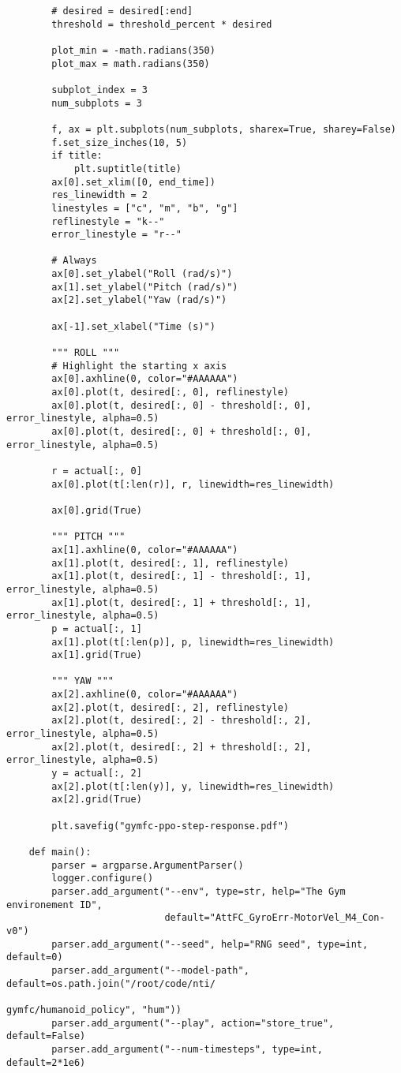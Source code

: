 \begin{verbatim}
        # desired = desired[:end]
        threshold = threshold_percent * desired

        plot_min = -math.radians(350)
        plot_max = math.radians(350)

        subplot_index = 3
        num_subplots = 3

        f, ax = plt.subplots(num_subplots, sharex=True, sharey=False)
        f.set_size_inches(10, 5)
        if title:
            plt.suptitle(title)
        ax[0].set_xlim([0, end_time])
        res_linewidth = 2
        linestyles = ["c", "m", "b", "g"]
        reflinestyle = "k--"
        error_linestyle = "r--"

        # Always
        ax[0].set_ylabel("Roll (rad/s)")
        ax[1].set_ylabel("Pitch (rad/s)")
        ax[2].set_ylabel("Yaw (rad/s)")

        ax[-1].set_xlabel("Time (s)")

        """ ROLL """
        # Highlight the starting x axis
        ax[0].axhline(0, color="#AAAAAA")
        ax[0].plot(t, desired[:, 0], reflinestyle)
        ax[0].plot(t, desired[:, 0] - threshold[:, 0], error_linestyle, alpha=0.5)
        ax[0].plot(t, desired[:, 0] + threshold[:, 0], error_linestyle, alpha=0.5)

        r = actual[:, 0]
        ax[0].plot(t[:len(r)], r, linewidth=res_linewidth)

        ax[0].grid(True)

        """ PITCH """
        ax[1].axhline(0, color="#AAAAAA")
        ax[1].plot(t, desired[:, 1], reflinestyle)
        ax[1].plot(t, desired[:, 1] - threshold[:, 1], error_linestyle, alpha=0.5)
        ax[1].plot(t, desired[:, 1] + threshold[:, 1], error_linestyle, alpha=0.5)
        p = actual[:, 1]
        ax[1].plot(t[:len(p)], p, linewidth=res_linewidth)
        ax[1].grid(True)

        """ YAW """
        ax[2].axhline(0, color="#AAAAAA")
        ax[2].plot(t, desired[:, 2], reflinestyle)
        ax[2].plot(t, desired[:, 2] - threshold[:, 2], error_linestyle, alpha=0.5)
        ax[2].plot(t, desired[:, 2] + threshold[:, 2], error_linestyle, alpha=0.5)
        y = actual[:, 2]
        ax[2].plot(t[:len(y)], y, linewidth=res_linewidth)
        ax[2].grid(True)

        plt.savefig("gymfc-ppo-step-response.pdf")

    def main():
        parser = argparse.ArgumentParser()
        logger.configure()
        parser.add_argument("--env", type=str, help="The Gym environement ID",
                            default="AttFC_GyroErr-MotorVel_M4_Con-v0")
        parser.add_argument("--seed", help="RNG seed", type=int, default=0)
        parser.add_argument("--model-path", default=os.path.join("/root/code/nti/
                                                    gymfc/humanoid_policy", "hum"))
        parser.add_argument("--play", action="store_true", default=False)
        parser.add_argument("--num-timesteps", type=int, default=2*1e6)


\end{verbatim}
